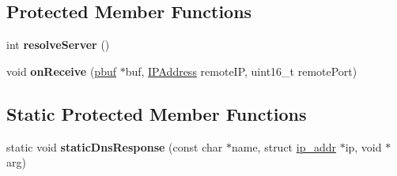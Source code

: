 \subsection*{Protected Member Functions}
\begin{DoxyCompactItemize}
\item 
\hypertarget{class_ntp_client_af542fa6108dfc497145cee6228776115}{}int {\bfseries resolve\+Server} ()\label{class_ntp_client_af542fa6108dfc497145cee6228776115}

\item 
\hypertarget{class_ntp_client_acc2092a5f662df125d7dd6600dad5ec3}{}void {\bfseries on\+Receive} (\hyperlink{structpbuf}{pbuf} $\ast$buf, \hyperlink{class_i_p_address}{I\+P\+Address} remote\+I\+P, uint16\+\_\+t remote\+Port)\label{class_ntp_client_acc2092a5f662df125d7dd6600dad5ec3}

\end{DoxyCompactItemize}
\subsection*{Static Protected Member Functions}
\begin{DoxyCompactItemize}
\item 
\hypertarget{class_ntp_client_ab4015733d3546a6c1c5b787aab2afc85}{}static void {\bfseries static\+Dns\+Response} (const char $\ast$name, struct \hyperlink{structip__addr}{ip\+\_\+addr} $\ast$ip, void $\ast$arg)\label{class_ntp_client_ab4015733d3546a6c1c5b787aab2afc85}

\end{DoxyCompactItemize}
